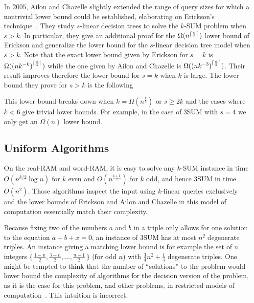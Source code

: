 

In 2005, Ailon and Chazelle slightly extended the range of query sizes for
which a nontrivial lower bound could be established, elaborating on Erickson's
technique~\cite{AC05}.
%
They study \(s\)-linear decision trees to solve the \(k\)-SUM problem when
\(s > k\). In particular, they give an additional proof for the
$\Omega(n^{\lceil\frac{k}{2}\rceil})$ lower bound of Erickson and
generalize the lower bound for the \(s\)-linear decision tree model when \(s >
k\). Note that the exact lower bound given by Erickson for \(s = k\) is
$\Omega({(nk^{-k})}^{\lceil\frac{k}{2}\rceil})$ while the one given by
Ailon and Chazelle is $\Omega({(nk^{-3})}^{\lceil\frac{k}{2}\rceil})$. Their result
improves therefore the lower bound for \(s = k\) when \(k\) is large.
The lower bound they prove for \(s > k\) is the following
%

%
This lower bound breaks down when
\(k = \Omega(n^{\frac{1}{3}})\) or \(s \ge 2 k\) and the cases where \(k < 6\)
give trivial lower bounds. For example, in the case
of 3SUM with \(s = 4\) we only get an $\Omega(n)$ lower bound.

\subsection{Uniform Algorithms}%
\label{sec:history:sum:uniform-algorithms}

On the real-RAM and word-RAM,
it is easy to solve any \(k\)-SUM instance in time \(O(n^{k/2} \log n)\) for
\(k\) even and \(O(n^{\frac{k+1}{2}})\) for \(k\) odd,
and hence 3SUM in time \(O(n^2)\). Those algorithms inspect the input using
\(k\)-linear queries exclusively and the lower bounds of Erickson and Ailon and
Chazelle in this model of computation essentially match their complexity.

Because fixing two of the numbers $a$ and $b$ in a triple only allows for one
solution to the equation $a + b + x = 0$, an instance of 3SUM has at most
$n^2$ degenerate triples. An instance giving a matching lower bound is for
example the set
of \(n\) integers
$\{\,\frac{1-n}{2},\frac{3-n}{2},\ldots,\frac{n-1}{2}\,\}$ (for odd $n$)
with $\frac{3}{4} n^2 + \frac 14$ degenerate triples.
%
One might be tempted to think that the number of ``solutions'' to the problem
would lower bound the complexity of algorithms for the decision version of the
problem, as it is the case for this problem, and other problems, in restricted
models of computation~\cite{Er96,Er99a}.
%
This intuition is incorrect.

